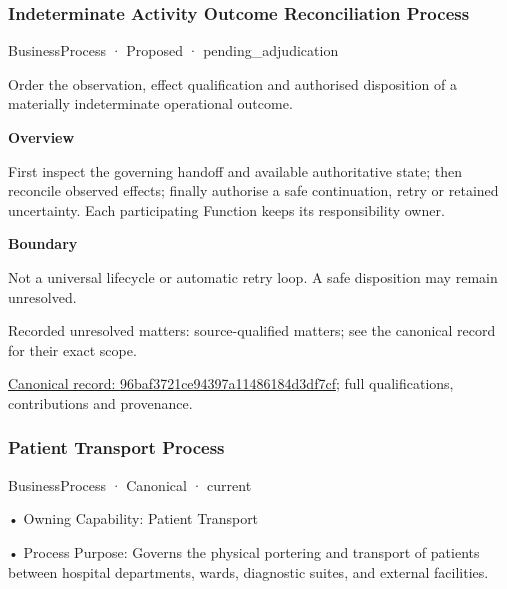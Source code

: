 \subsubsection{Indeterminate Activity Outcome Reconciliation Process}

\label{element:96baf3721ce94397a11486184d3df7cf}
{\small BusinessProcess · Proposed · pending\_adjudication}\par

Order the observation, effect qualification and authorised disposition of a materially indeterminate operational outcome.



\textbf{Overview}



First inspect the governing handoff and available authoritative state; then reconcile observed effects; finally authorise a safe continuation, retry or retained uncertainty. Each participating Function keeps its responsibility owner.



\textbf{Boundary}



Not a universal lifecycle or automatic retry loop. A safe disposition may remain unresolved.


{\small Recorded unresolved matters: source-qualified matters; see the canonical record for their exact scope.}\par
{\footnotesize \href{../../../../continuum/business/business-process/96baf3721ce94397a11486184d3df7cf.md}{Canonical record: 96baf3721ce94397a11486184d3df7cf}; full qualifications, contributions and provenance.}\par
\subsubsection{Patient Transport Process}

\label{element:f2e58fd18cd94b0faaa364d3890a7c9e}
{\small BusinessProcess · Canonical · current}\par

•
Owning Capability: Patient Transport



•
Process Purpose: Governs the physical portering and transport of patients between hospital departments, wards, diagnostic suites, and external facilities.



